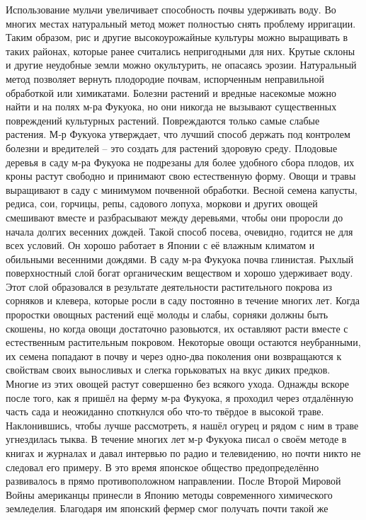 \documentclass[a4paper]{book}
\begin{document}
Использование мульчи увеличивает способность почвы удерживать воду. Во многих
местах натуральный метод может полностью снять проблему ирригации. Таким образом, рис
и другие высокоурожайные культуры можно выращивать в таких районах, которые ранее
считались непригодными для них. Крутые склоны и другие неудобные земли можно
окультурить, не опасаясь эрозии. Натуральный метод позволяет вернуть плодородие почвам,
испорченным неправильной обработкой или химикатами.
Болезни растений и вредные насекомые можно найти и на полях м-ра Фукуока, но они
никогда не вызывают существенных повреждений культурных растений. Повреждаются
только самые слабые растения. М‑р Фукуока утверждает, что лучший способ держать под
контролем болезни и вредителей – это создать для растений здоровую среду.
Плодовые деревья в саду м-ра Фукуока не подрезаны для более удобного сбора плодов,
их кроны растут свободно и принимают свою естественную форму. Овощи и травы
выращивают в саду с минимумом почвенной обработки. Весной семена капусты, редиса,
сои, горчицы, репы, садового лопуха, моркови и других овощей смешивают вместе и
разбрасывают между деревьями, чтобы они проросли до начала долгих весенних дождей.
Такой способ посева, очевидно, годится не для всех условий. Он хорошо работает в Японии с
её влажным климатом и обильными весенними дождями. В саду м-ра Фукуока почва
глинистая. Рыхлый поверхностный слой богат органическим веществом и хорошо
удерживает воду. Этот слой образовался в результате деятельности растительного покрова из
сорняков и клевера, которые росли в саду постоянно в течение многих лет.
Когда проростки овощных растений ещё молоды и слабы, сорняки должны быть
скошены, но когда овощи достаточно разовьются, их оставляют расти вместе с естественным
растительным покровом. Некоторые овощи остаются неубранными, их семена попадают в
почву и через одно-два поколения они возвращаются к свойствам своих выносливых и слегка
горьковатых на вкус диких предков. Многие из этих овощей растут совершенно без всякого
ухода. Однажды вскоре после того, как я пришёл на ферму м-ра Фукуока, я проходил через
отдалённую часть сада и неожиданно споткнулся обо что-то твёрдое в высокой траве.
Наклонившись, чтобы лучше рассмотреть, я нашёл огурец и рядом с ним в траве угнездилась
тыква.
В течение многих лет м-р Фукуока писал о своём методе в книгах и журналах и давал
интервью по радио и телевидению, но почти никто не следовал его примеру. В это время
японское общество предопределённо развивалось в прямо противоположном направлении.
После Второй Мировой Войны американцы принесли в Японию методы современного
химического земледелия. Благодаря им японский фермер смог получать почти такой же
\end{document}
